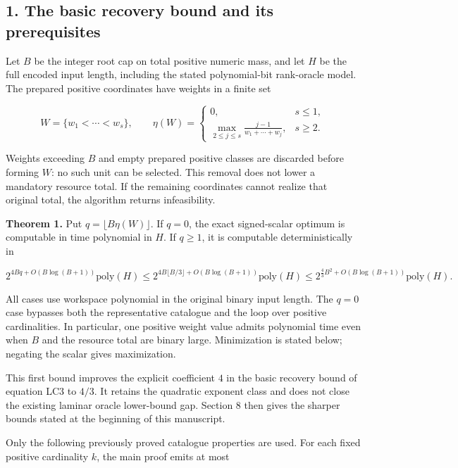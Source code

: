 \hypertarget{af-fe230a140d-the-basic-recovery-bound-and-its-prerequisites}{%
\subsection{1. The basic recovery bound and its prerequisites}\label{af-fe230a140d-the-basic-recovery-bound-and-its-prerequisites}}

Let \(B\) be the integer root cap on total positive numeric mass, and let \(H\) be the full encoded input length, including the stated polynomial-bit rank-oracle model. The prepared positive coordinates have weights in a finite set

\[
W=\{w_1<\cdots<w_s\},\qquad
\eta(W)=
\begin{cases}
0,&s\le1,\\
\displaystyle\max_{2\le j\le s}
\frac{j-1}{w_1+\cdots+w_j},&s\ge2.
\end{cases}
\tag{DW1}
\]

Weights exceeding \(B\) and empty prepared positive classes are discarded before forming \(W\): no such unit can be selected. This removal does not lower a mandatory resource total. If the remaining coordinates cannot realize that original total, the algorithm returns infeasibility.

\textbf{Theorem 1.} Put \(q=\lfloor B\eta(W)\rfloor\). If \(q=0\), the exact signed-scalar optimum is computable in time polynomial in \(H\). If \(q\ge1\), it is computable deterministically in

\[
2^{4Bq+O(B\log(B+1))}\mathrm{poly}(H)
\le
2^{4B\lfloor B/3\rfloor+O(B\log(B+1))}
\mathrm{poly}(H)
\le
2^{\frac43 B^2+O(B\log(B+1))}\mathrm{poly}(H).
\tag{DW2}
\]

All cases use workspace polynomial in the original binary input length. The \(q=0\) case bypasses both the representative catalogue and the loop over positive cardinalities. In particular, one positive weight value admits polynomial time even when \(B\) and the resource total are binary large. Minimization is stated below; negating the scalar gives maximization.

This first bound improves the explicit coefficient \(4\) in the basic recovery bound of equation LC3 to \(4/3\). It retains the quadratic exponent class and does not close the existing laminar oracle lower-bound gap. Section 8 then gives the sharper bounds stated at the beginning of this manuscript.

Only the following previously proved catalogue properties are used. For each fixed positive cardinality \(k\), the main proof emits at most

